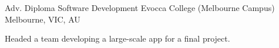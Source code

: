 

\begin{cventries}

  \cventry
    {Adv. Diploma Software Development} %
    {Evocca College (Melbourne Campus)} %
    {Melbourne, VIC, AU} %
    {
      \begin{cvitems}
        \item {Headed a team developing a large-scale app for a final project.}
      \end{cvitems}
    }
\end{cventries}
